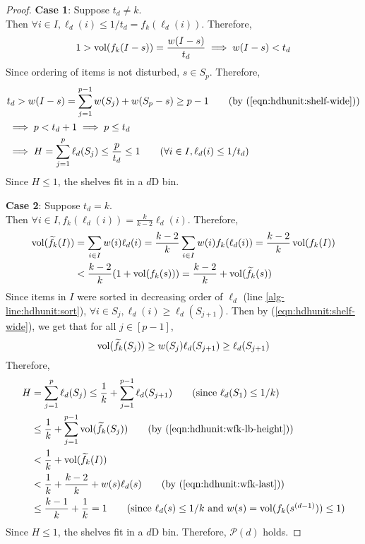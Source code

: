 \begin{proof}
\textbf{Case 1}: Suppose $t_d \neq k$.\\
Then $\forall i \in I, \ell_d(i) \le 1/t_d = f_k(\ell_d(i))$. Therefore,
\[ 1 > \operatorname{vol}(f_k(I-s)) = \frac{w(I-s)}{t_d} \implies w(I-s) < t_d \]
Since ordering of items is not disturbed, $s \in S_p$. Therefore,
\begin{align*}
& t_d > w(I-s) = \sum_{j=1}^{p-1} w(S_j) + w(S_p - s) \ge p-1
\tag{by (\ref{eqn:hdhunit:shelf-wide})}
\\ &\implies p < t_d + 1 \implies p \le t_d
\\ &\implies H = \sum_{j=1}^p \ell_d(S_j) \le \frac{p}{t_d} \le 1
\tag{$\forall i \in I, \ell_d(i) \le 1/t_d$}
\end{align*}
Since $H \le 1$, the shelves fit in a $d$D bin.

\textbf{Case 2}: Suppose $t_d = k$.\\
Then $\forall i \in I, f_k(\ell_d(i)) = \frac{k}{k-2}\ell_d(i)$. Therefore,
\begin{align}
\operatorname{vol}(\widetilde{f}_{k}(I)) &= \sum_{i \in I} w(i)\ell_d(i)
= \frac{k-2}{k} \sum_{i \in I} w(i)f_k(\ell_d(i))
= \frac{k-2}{k} \operatorname{vol}(f_k(I))
\nonumber
\\ \label{eqn:hdhunit:wfk-last}
&< \frac{k-2}{k} (1 + \operatorname{vol}(f_k(s)))
= \frac{k-2}{k} + \operatorname{vol}(\widetilde{f}_{k}(s))
\end{align}
Since items in $I$ were sorted in decreasing order of $\ell_d$
(line \ref{alg-line:hdhunit:sort}),
$\forall i \in S_j, \ell_d(i) \ge \ell_d(S_{j+1})$.
Then by (\ref{eqn:hdhunit:shelf-wide}), we get that for all $j \in [p-1]$,
\begin{equation}
\label{eqn:hdhunit:wfk-lb-height}
\operatorname{vol}(\widetilde{f}_{k}(S_j)) \ge w(S_j)\ell_d(S_{j+1}) \ge \ell_d(S_{j+1})
\end{equation}
Therefore,
\begin{align*}
H &= \sum_{j=1}^{p} \ell_d(S_j)
\le \frac{1}{k} + \sum_{j=1}^{p-1} \ell_d(S_{j+1})
\tag{since $\ell_d(S_1) \le 1/k$}
\\ &\le \frac{1}{k} + \sum_{j=1}^{p-1} \vol(\wfk(S_j))
\tag{by (\ref{eqn:hdhunit:wfk-lb-height})}
\\ &< \frac{1}{k} + \vol(\wfk(I))
\\ &< \frac{1}{k} + \frac{k-2}{k} + w(s)\ell_d(s)
\tag{by (\ref{eqn:hdhunit:wfk-last})}
\\ &\le \frac{k-1}{k} + \frac{1}{k} = 1
\tag{since $\ell_d(s) \le 1/k$ and $w(s) = \vol(f_k(s^{(d-1)})) \le 1$}
\end{align*}
Since $H \le 1$, the shelves fit in a $d$D bin.
Therefore, $\mathcal{P}(d)$ holds.


\end{proof}
